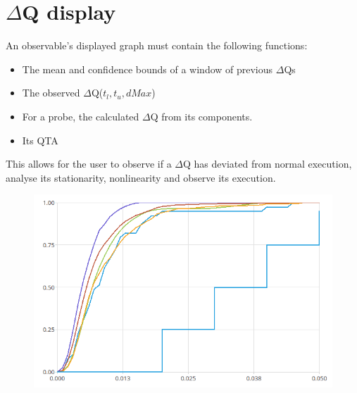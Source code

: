 \section{$\Delta$Q display}
    An observable's displayed graph must contain the following functions:
    \begin{itemize}
        \item The mean and confidence bounds of a window of previous $\Delta$Qs
        \item The observed $\Delta$Q($t_l, t_u, dMax$)
        \item For a probe, the calculated $\Delta$Q from its components.
        \item Its QTA
    \end{itemize}
    This allows for the user to observe if a $\Delta$Q has deviated from normal execution, analyse its stationarity, nonlinearity and observe its execution.
    \begin{figure}[!ht]    
    \includegraphics[scale =0.8, width=\textwidth]{img/dqdispl.png}
    \end{figure}
